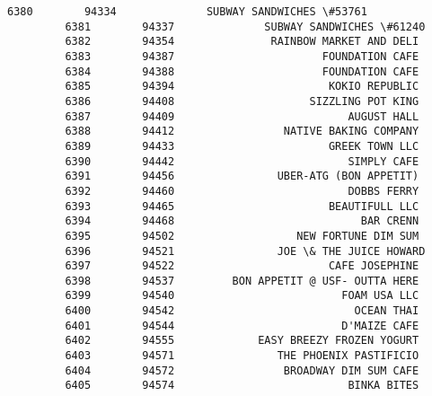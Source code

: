 \documentclass[11pt]{article}
\begin{document}
\begin{Verbatim}[commandchars=\\\{\}]
         6380        94334              SUBWAY SANDWICHES \#53761   
         6381        94337              SUBWAY SANDWICHES \#61240   
         6382        94354               RAINBOW MARKET AND DELI   
         6383        94387                       FOUNDATION CAFE   
         6384        94388                       FOUNDATION CAFE   
         6385        94394                        KOKIO REPUBLIC   
         6386        94408                     SIZZLING POT KING   
         6387        94409                           AUGUST HALL   
         6388        94412                 NATIVE BAKING COMPANY   
         6389        94433                        GREEK TOWN LLC   
         6390        94442                           SIMPLY CAFE   
         6391        94456                UBER-ATG (BON APPETIT)   
         6392        94460                           DOBBS FERRY   
         6393        94465                        BEAUTIFULL LLC   
         6394        94468                             BAR CRENN   
         6395        94502                   NEW FORTUNE DIM SUM   
         6396        94521                JOE \& THE JUICE HOWARD   
         6397        94522                        CAFE JOSEPHINE   
         6398        94537         BON APPETIT @ USF- OUTTA HERE   
         6399        94540                          FOAM USA LLC   
         6400        94542                            OCEAN THAI   
         6401        94544                          D'MAIZE CAFE   
         6402        94555             EASY BREEZY FROZEN YOGURT   
         6403        94571                THE PHOENIX PASTIFICIO   
         6404        94572                 BROADWAY DIM SUM CAFE   
         6405        94574                           BINKA BITES   
         

\end{Verbatim}
\end{document}
